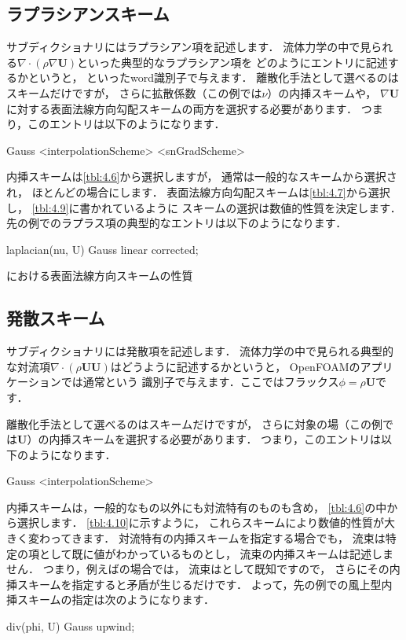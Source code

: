 \subsection{ラプラシアンスキーム}
\label{ssec:4.4.4}
サブディクショナリにはラプラシアン項を記述します．
流体力学の中で見られる$\nabla \cdot (\rho\nabla\bm{U})$といった典型的なラプラシアン項を
どのようにエントリに記述するかというと，
といったword識別子で与えます．
離散化手法として選べるのはスキームだけですが，
さらに拡散係数（この例では$\nu$）の内挿スキームや，
$\nabla\bm{U}$に対する表面法線方向勾配スキームの両方を選択する必要があります．
つまり，このエントリは以下のようになります．
\begin{OFverbatim}[file]
Gauss <interpolationScheme> <snGradScheme>
\end{OFverbatim}
内挿スキームは\autoref{tbl:4.6}から選択しますが，
通常は一般的なスキームから選択され，
ほとんどの場合にします．
表面法線方向勾配スキームは\autoref{tbl:4.7}から選択し，
\autoref{tbl:4.9}に書かれているように
スキームの選択は数値的性質を決定します．
先の例でのラプラス項の典型的なエントリは以下のようになります．
\begin{OFverbatim}[file]
laplacian(nu, U) Gauss linear corrected;
\end{OFverbatim}


\begin{table}[ht]
 
 \caption{における表面法線方向スキームの性質}
 \label{tbl:4.9}
\end{table}


\subsection{発散スキーム}
\label{ssec:4.4.5}
サブディクショナリには発散項を記述します．
流体力学の中で見られる典型的な対流項$\nabla \cdot (\rho\bm{U}\bm{U})$はどうように記述するかというと，
OpenFOAMのアプリケーションでは通常という
識別子で与えます．ここではフラックス$\phi = \rho\bm{U}$です．

離散化手法として選べるのはスキームだけですが，
さらに対象の場（この例では$\bm{U}$）の内挿スキームを選択する必要があります．
つまり，このエントリは以下のようになります．
\begin{OFverbatim}[file]
Gauss <interpolationScheme>
\end{OFverbatim}
内挿スキームは，一般的なもの以外にも対流特有のものも含め，
\autoref{tbl:4.6}の中から選択します．
\autoref{tbl:4.10}に示すように，
これらスキームにより数値的性質が大きく変わってきます．
対流特有の内挿スキームを指定する場合でも，
流束は特定の項として既に値がわかっているものとし，
流束の内挿スキームは記述しません．
つまり，例えばの場合では，
流束はとして既知ですので，
さらにその内挿スキームを指定すると矛盾が生じるだけです．
よって，先の例での風上型内挿スキームの指定は次のようになります．
\begin{OFverbatim}[file]
div(phi, U) Gauss upwind;
\end{OFverbatim}


